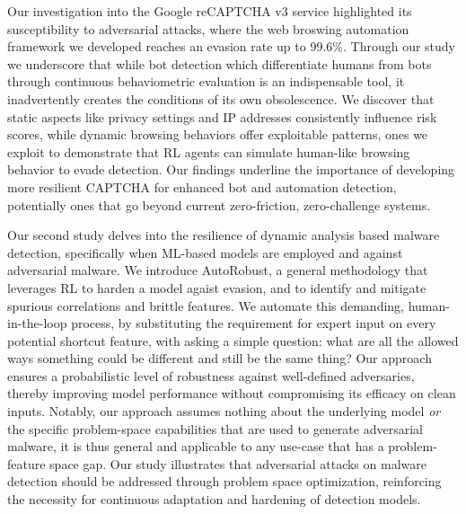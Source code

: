 Our investigation into the Google reCAPTCHA v3 service highlighted its susceptibility to adversarial attacks, where the web broswing automation framework we developed reaches an evasion rate up to 99.6\%.
Through our study we underscore that while bot detection which differentiate humans from bots through continuous behaviometric evaluation is an indispensable tool, it inadvertently creates the conditions of its own obsolescence.
We discover that static aspects like privacy settings and IP addresses consistently influence risk scores, while dynamic browsing behaviors offer exploitable patterns, ones we exploit to demonstrate that \gls{RL} agents can simulate human-like browsing behavior to evade detection.
Our findings underline the importance of developing more resilient CAPTCHA for enhanced bot and automation detection, potentially ones that go beyond current zero-friction, zero-challenge systems.

Our second study delves into the resilience of dynamic analysis based  malware detection, specifically when ML-based models are employed and against adversarial malware.
We introduce AutoRobust, a general methodology that leverages \gls{RL} to harden a model agaist evasion, and to identify and mitigate spurious correlations and brittle features.
We automate this demanding, human-in-the-loop process, by substituting the requirement for expert input on every potential shortcut feature, with asking a simple question: what are all the allowed ways something could be different and still be the same thing?
Our approach ensures a probabilistic level of robustness against well-defined adversaries, thereby improving model performance without compromising its efficacy on clean inputs.
Notably, our approach assumes nothing about the underlying model \textit{or} the specific problem-space capabilities that are used to generate adversarial malware, it is thus general and applicable to any use-case that has a problem-feature space gap.
Our study illustrates that adversarial attacks on malware detection should be addressed through problem space optimization, reinforcing the necessity for continuous adaptation and hardening of detection models.

